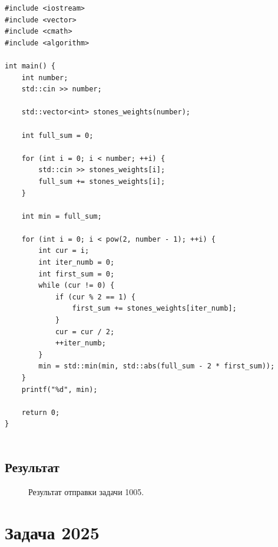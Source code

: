 \documentclass[a5paper, 10pt]{article}
\theoremstyle{definition}
\theoremstyle{plain}
\theoremstyle{remark}
\begin{document}
\begin{center}
\begin{lstlisting}[label=some-code,caption={Исходный код для 1005}]
#include <iostream>
#include <vector>
#include <cmath>
#include <algorithm>

int main() {
    int number;
    std::cin >> number;

    std::vector<int> stones_weights(number);

    int full_sum = 0;

    for (int i = 0; i < number; ++i) {
        std::cin >> stones_weights[i];
        full_sum += stones_weights[i];
    }

    int min = full_sum;

    for (int i = 0; i < pow(2, number - 1); ++i) {
        int cur = i;
        int iter_numb = 0;
        int first_sum = 0;
        while (cur != 0) {
            if (cur % 2 == 1) {
                first_sum += stones_weights[iter_numb];
            }
            cur = cur / 2;
            ++iter_numb;
        }
        min = std::min(min, std::abs(full_sum - 2 * first_sum));
    }
    printf("%d", min);

    return 0;
}


\end{lstlisting}
\end{center}

\subsection{Результат}
\begin{figure}[h]
\caption{Результат отправки задачи 1005.}
\end{figure}


\newpage
\section{Задача 2025}
\end{document}
